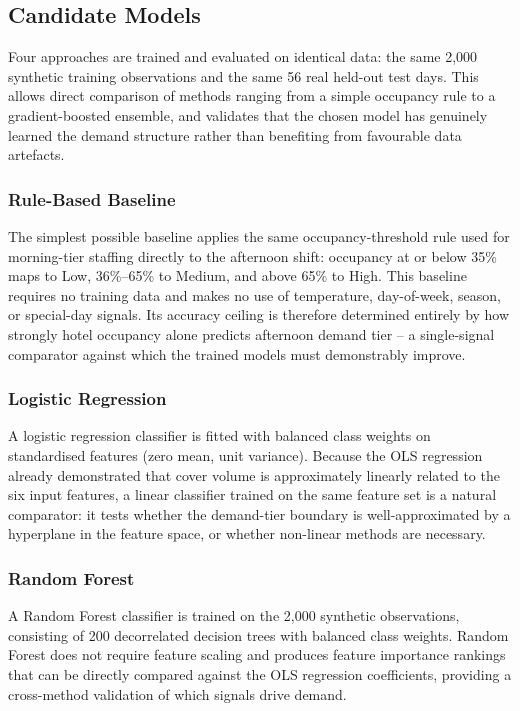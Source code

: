 \documentclass[12pt,a4paper,oneside]{article}
\begin{document}
\subsection{Candidate Models}

Four approaches are trained and evaluated on identical data: the same 2,000 synthetic training observations and the same 56 real held-out test days. This allows direct comparison of methods ranging from a simple occupancy rule to a gradient-boosted ensemble, and validates that the chosen model has genuinely learned the demand structure rather than benefiting from favourable data artefacts.

\subsubsection{Rule-Based Baseline}

The simplest possible baseline applies the same occupancy-threshold rule used for morning-tier staffing directly to the afternoon shift: occupancy at or below 35\% maps to Low, 36\%--65\% to Medium, and above 65\% to High. This baseline requires no training data and makes no use of temperature, day-of-week, season, or special-day signals. Its accuracy ceiling is therefore determined entirely by how strongly hotel occupancy alone predicts afternoon demand tier -- a single-signal comparator against which the trained models must demonstrably improve.

\subsubsection{Logistic Regression}

A logistic regression classifier is fitted with balanced class weights on standardised features (zero mean, unit variance). Because the OLS regression already demonstrated that cover volume is approximately linearly related to the six input features, a linear classifier trained on the same feature set is a natural comparator: it tests whether the demand-tier boundary is well-approximated by a hyperplane in the feature space, or whether non-linear methods are necessary.

\subsubsection{Random Forest}

A Random Forest classifier \citep{breiman2001} is trained on the 2,000 synthetic observations, consisting of 200 decorrelated decision trees with balanced class weights. Random Forest does not require feature scaling and produces feature importance rankings that can be directly compared against the OLS regression coefficients, providing a cross-method validation of which signals drive demand.
\end{document}
